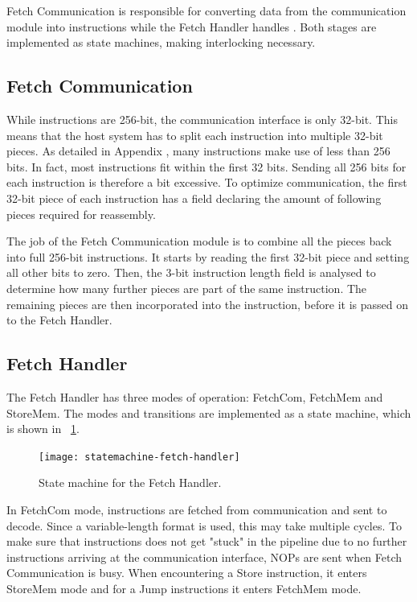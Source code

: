 Fetch Communication is responsible for converting data from the communication module into instructions while the Fetch Handler handles .
Both stages are implemented as state machines, making interlocking necessary.

\subsection{Fetch Communication}

While instructions are 256-bit, the communication interface is only 32-bit.
This means that the host system has to split each instruction into multiple 32-bit pieces.
As detailed in Appendix , many instructions make use of less than 256 bits.
In fact, most instructions fit within the first 32 bits.
Sending all 256 bits for each instruction is therefore a bit excessive.
To optimize communication, the first 32-bit piece of each instruction has a field declaring the amount of following pieces required for reassembly.

The job of the Fetch Communication module is to combine all the pieces back into full 256-bit instructions.
It starts by reading the first 32-bit piece and setting all other bits to zero.
Then, the 3-bit instruction length field is analysed to determine how many further pieces are part of the same instruction.
The remaining pieces are then incorporated into the instruction, before it is passed on to the Fetch Handler.

\subsection{Fetch Handler}

The Fetch Handler has three modes of operation: FetchCom, FetchMem and StoreMem.
The modes and transitions are implemented as a state machine, which is shown in \figurename~\ref{fig:statemachine-fetch-handler}.

\begin{figure}[!ht]
    \centering
    \texttt{[image: statemachine-fetch-handler]}
    \caption[Fetch Handler state machine]{State machine for the Fetch Handler.}
    \label{fig:statemachine-fetch-handler}
\end{figure}

In FetchCom mode, instructions are fetched from communication and sent to decode.
Since a variable-length format is used, this may take multiple cycles.
To make sure that instructions does not get "stuck" in the pipeline due to no further instructions arriving at the communication interface, NOPs are sent when Fetch Communication is busy.
When encountering a Store instruction, it enters StoreMem mode and for a Jump instructions it enters FetchMem mode.

